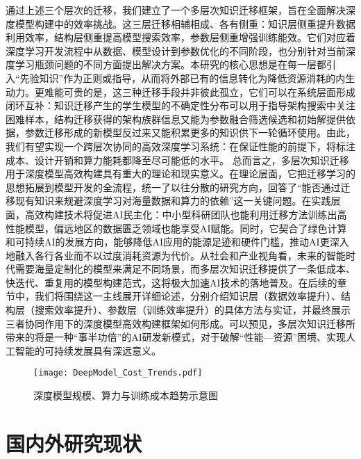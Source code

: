 通过上述三个层次的迁移，我们建立了一个多层次知识迁移框架，旨在全面解决深度模型构建中的效率挑战。这三层迁移相辅相成、各有侧重：知识层侧重提升数据利用效率，结构层侧重提高模型搜索效率，参数层侧重增强训练能效。它们对应着深度学习开发流程中从数据、模型设计到参数优化的不同阶段，也分别针对当前深度学习瓶颈问题的不同方面提出解决方案。本研究的核心思想是在每一层都引入“先验知识”作为正则或指导，从而将外部已有的信息转化为降低资源消耗的内生动力。更难能可贵的是，这三种迁移手段并非彼此孤立，它们可以在系统层面形成闭环互补：知识迁移产生的学生模型的不确定性分布可以用于指导架构搜索中关注困难样本，结构迁移获得的架构族群信息又能为参数融合筛选候选和初始解提供依据，参数迁移形成的新模型反过来又能积累更多的知识供下一轮循环使用。由此，我们有望实现一个跨层次协同的高效深度学习系统：在保证性能的前提下，将标注成本、设计开销和算力能耗都降至尽可能低的水平。
总而言之，多层次知识迁移用于深度模型高效构建具有重大的理论和现实意义。在理论层面，它把迁移学习的思想拓展到模型开发的全流程，统一了以往分散的研究方向，回答了“能否通过迁移现有知识来规避深度学习对海量数据和算力的依赖”这一关键问题。在实践层面，高效构建技术将促进AI民主化：中小型科研团队也能利用迁移方法训练出高性能模型，偏远地区的数据匮乏领域也能享受AI赋能。同时，它契合了绿色计算和可持续AI的发展方向，能够降低AI应用的能源足迹和硬件门槛，推动AI更深入地融入各行各业而不以过度消耗资源为代价。从社会和产业视角看，未来的智能时代需要海量定制化的模型来满足不同场景，而多层次知识迁移提供了一条低成本、快迭代、重复用的模型构建范式，这将极大加速AI技术的落地普及。在后续的章节中，我们将围绕这一主线展开详细论述，分别介绍知识层（数据效率提升）、结构层（搜索效率提升）、参数层（训练效率提升）的具体方法与实证，并最终展示三者协同作用下的深度模型高效构建框架如何形成。可以预见，多层次知识迁移所带来的将是一种“事半功倍”的AI研发新模式，对于破解“性能—资源”困境、实现人工智能的可持续发展具有深远意义。




\begin{figure}[htbp]
	\centering
	\texttt{[image: DeepModel\_Cost\_Trends.pdf]}
	\caption{深度模型规模、算力与训练成本趋势示意图}
	\label{fig:DeepModel_Cost_Trends}
\end{figure}

\section[\hspace{-2pt}国内外研究现状]{{\heiti{} \hspace{-8pt}国内外研究现状}}
\label{sec:intro-review}

